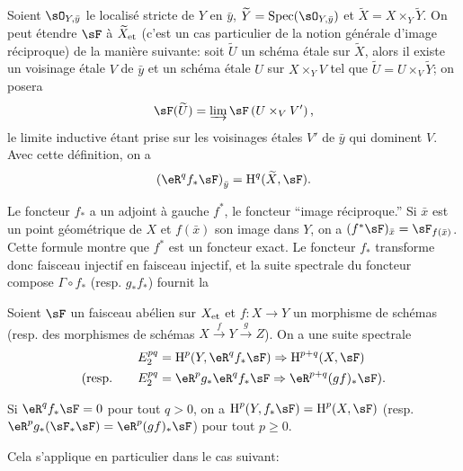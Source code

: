 Soient $\sO_{Y,\bar y}$ le localisé stricte de $Y$ en $\bar y$, 
$\widetilde Y=\spec(\sO_{Y,\bar y})$ et $\widetilde X=X\times_Y \widetilde Y$. 
On peut étendre $\sF$ à ${\widetilde X}_{\textnormal{et}}$ (c'est un cas particulier de la 
notion générale d'image réciproque) de la manière suivante: soit 
$\widetilde U$ un schéma étale sur $\widetilde X$, alors il existe un 
voisinage étale $V$ de $\bar y$ et un schéma étale $U$ sur $X\times_Y V$ tel 
que $\widetilde U=U\times_V \widetilde Y$; on posera 
\[
  \sF(\widetilde U)=\varinjlim \sF\left(U\times_V V'\right)\text{,}
\]
le limite inductive étant prise sur les voisinages étales $V'$ de $\bar y$ qui 
dominent $V$. Avec cette définition, on a 
\[
  \left(\eR^q f_* \sF\right)_{\bar y} = \h^q(\widetilde X,\sF)\text{.}
\]

Le foncteur $f_*$ a un adjoint à gauche $f^*$, le foncteur ``image 
réciproque.'' Si $\bar x$ est un point géométrique de $X$ et $f(\bar x)$ son 
image dans $Y$, on a $(f^* \sF)_{\bar x} = \sF_{f(\bar x)}$. Cette formule montre 
que $f^*$ est un foncteur exact. Le foncteur $f_*$ transforme donc faisceau 
injectif en faisceau injectif, et la suite spectrale du foncteur compose 
$\Gamma\circ f_*$ (resp. $g_* f_*$) fournit la 





\begin{theorem}\label{I:2-3-4}
Soient $\sF$ un faisceau abélien sur ${X}_{\textnormal{et}}$ et $f:X\to Y$ un morphisme de 
schémas (resp. des morphismes de schémas $X\xrightarrow f Y \xrightarrow g Z$). 
On a une suite spectrale 
\begin{align*}
  E_2^{pq} &= \h^p(Y,\eR^q f_* \sF) \Rightarrow \h^{p+q}(X,\sF) \\
  \text{(resp.}\qquad E_2^{pq} &= \eR^p g_* \eR^q f_* \sF \Rightarrow \eR^{p+q}(gf)_* \sF\text{).}
\end{align*}
\end{theorem}





\begin{corollary}\label{I:2-3-5}
Si $\eR^q f_* \sF=0$ pour tout $q>0$, on a $\h^p(Y,f_* \sF)=\h^p(X,\sF)$ (resp. 
$\eR^p g_*(\sF_* \sF) = \eR^p(g f)_* \sF$) pour tout $p\geqslant 0$. 
\end{corollary}

Cela s'applique en particulier dans le cas suivant:






